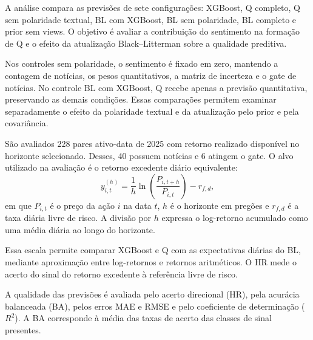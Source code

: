 A análise compara as previsões de sete configurações:
XGBoost, Q completo, Q sem polaridade textual, BL com XGBoost,
BL sem polaridade, BL completo e prior sem views. O objetivo
é avaliar a contribuição do sentimento na formação de Q
e o efeito da atualização Black--Litterman sobre a qualidade
preditiva.

Nos controles sem polaridade, o sentimento é fixado em zero,
mantendo a contagem de notícias, os pesos quantitativos,
a matriz de incerteza e o gate de notícias. No controle
BL com XGBoost, Q recebe apenas a previsão quantitativa,
preservando as demais condições. Essas comparações permitem
examinar separadamente o efeito da polaridade textual e
da atualização pelo prior e pela covariância.

São avaliados 228 pares ativo-data de 2025 com retorno
realizado disponível no horizonte selecionado. Desses,
40 possuem notícias e 6 atingem o gate. O alvo utilizado
na avaliação é o retorno excedente diário equivalente:
\begin{equation}
\label{eq:alvo_diario_equivalente}
y_{i,t}^{(h)}
=
\frac{1}{h}
\ln\left(\frac{P_{i,t+h}}{P_{i,t}}\right)
-
r_{f,d},
\end{equation}
em que $P_{i,t}$ é o preço da ação $i$ na data $t$,
$h$ é o horizonte em pregões e $r_{f,d}$ é a taxa diária
livre de risco. A divisão por $h$ expressa o log-retorno
acumulado como uma média diária ao longo do horizonte.

Essa escala permite comparar XGBoost e Q com as expectativas
diárias do BL, mediante aproximação entre log-retornos
e retornos aritméticos. O HR mede o acerto do sinal do
retorno excedente à referência livre de risco.

A qualidade das previsões é avaliada pelo acerto direcional
(HR), pela acurácia balanceada (BA), pelos erros MAE e RMSE
e pelo coeficiente de determinação ($R^2$). A BA corresponde
à média das taxas de acerto das classes de sinal presentes.

